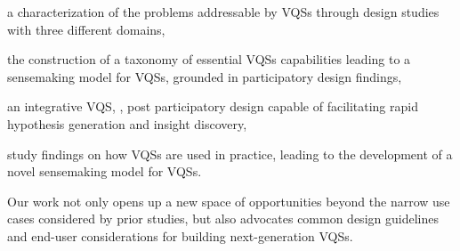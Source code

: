  \begin{denselist}
 \item a characterization of the problems addressable by VQSs through design studies with three different domains,
 \item the construction of a taxonomy of essential VQSs capabilities leading to a sensemaking model for VQSs, grounded in participatory design findings, %
 \item an integrative VQS, \zvpp, post participatory design capable of facilitating rapid hypothesis generation and insight discovery,
 \item study findings on how VQSs are used in practice, leading to the development of a novel sensemaking model for VQSs. %
 \end{denselist}
 Our work not only opens up a new space of opportunities beyond the narrow use cases considered by prior studies, but also advocates common design guidelines and end-user considerations for building next-generation VQSs.